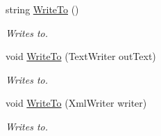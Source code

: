 \begin{DoxyCompactItemize}
string \hyperlink{class_html_agility_pack_1_1_html_node_abd511adf615fcbc8053e2254bcfc3146}{Write\+To} ()
\begin{DoxyCompactList}\small\item\em Writes to. \end{DoxyCompactList}\item 
void \hyperlink{class_html_agility_pack_1_1_html_node_a7b9de14e4a2c3efd00765c64d116ef79}{Write\+To} (Text\+Writer out\+Text)
\begin{DoxyCompactList}\small\item\em Writes to. \end{DoxyCompactList}\item 
void \hyperlink{class_html_agility_pack_1_1_html_node_a0e243f967d0f10e7ba51090d023b8f83}{Write\+To} (Xml\+Writer writer)
\begin{DoxyCompactList}\small\item\em Writes to. \end{DoxyCompactList}\end{DoxyCompactItemize}
